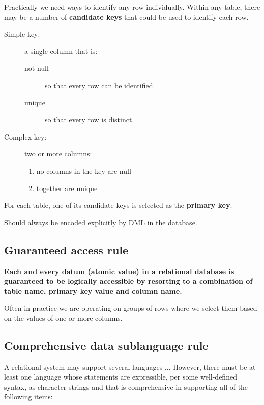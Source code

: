 \documentclass[slides]{pgnotes}
\begin{document}
Practically we need ways to identify any row individually.
Within any table, there may be a number of \textbf{candidate keys} that could be used to identify each row.
\begin{description}
\item[Simple key:] a single column that is:
  \begin{description}
  \item[not null] so that every row can be identified.
  \item[unique] so that every row is distinct. 
  \end{description}
\item[Complex key:] two or more columns:
  \begin{enumerate}
  \item no columns in the key are null
  \item together are unique
  \end{enumerate}
\end{description}
For each table, one of its candidate keys is selected as the \textbf{primary key}.

Should always be encoded explicitly by DML in the database.


\subsection{Guaranteed access rule}

\textbf{Each and every datum (atomic value) in a relational database is guaranteed to be logically accessible by resorting to a combination of table name, primary key value and column name.}

\begin{description}
\item Often in practice we are operating on groups of rows where we select them based on the values of one or more columns. 
\end{description}
  


\subsection{Comprehensive data sublanguage rule}

A relational system may support several languages ... However, there must be at least one language whose statements are expressible, per some well-defined syntax, as character strings and that is comprehensive in supporting all of the following items:
\end{document}
